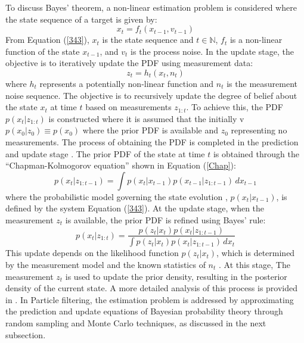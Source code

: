 To discuss Bayes' theorem, a non-linear estimation problem is considered where the state sequence of a target is given by:
\begin{equation}
    x_t = f_t(x_{t-1}, v_{t-1})
    \label{343}
\end{equation}
From Equation (\ref{343}), \(x_t\) is the state sequence and \(t \in \mathbb{N}\), \(f_t\) is a non-linear function of the state \(x_{t-1}\), and \(v_t\) is the process noise. In the update stage, the objective is to iteratively update the \ac{PDF} using measurement data:
\begin{equation}
    z_t = h_t(x_t, n_t)
\end{equation}
where \(h_t\) represents a potentially  non-linear function and \(n_t\) is the measurement noise sequence. The objective is to recursively update the degree of belief about the state \(x_t\) at time  \(t\) based on measurements \(z_{1:t}\). To achieve this, the \ac{PDF} \(p(x_t|z_{1:t})\) is constructed where it is assumed that the initially v \(p(x_0|z_0) \equiv p(x_0)\) where the prior \ac{PDF} is available and \(z_0\) representing no measurements. The process of obtaining the \ac{PDF} is completed in the prediction and update stage \cite{Arulampalam2007}.
\newline
\newline
The prior \ac{PDF} of the state at time \(t\) is obtained through the ``Chapman-Kolmogorov equation'' shown in Equation (\ref{Chap}):
\begin{equation}
    p(x_t|z_{1:t-1}) = \int p(x_t|x_{t-1}) p(x_{t-1}|z_{1:t-1}) \, dx_{t-1}
    \label{Chap}
\end{equation}
where the probabilistic model governing the state evolution \cite{Arulampalam2007}, \(p(x_t|x_{t-1})\), is defined by the system Equation (\ref{343}). At the update stage, when the measurement \(z_t\) is available, the prior \ac{PDF} is refined using Bayes' rule:
\begin{equation}
     p(x_t|z_{1:t}) = \frac{p(z_t|x_t) p(x_t|z_{1:t-1})}{\int p(z_t|x_t) p(x_t|z_{1:t-1}) \, dx_t}
    \label{bayes}
\end{equation}
This update depends on the likelihood function \(p(z_t|x_t)\), which is determined by the measurement model and the known statistics of \(n_t\) \cite{Arulampalam2007}. At this stage, The measurement \( z_t \) is used to update the prior density, resulting in the posterior density of the current state. A more detailed analysis of this process is provided in \cite{Arulampalam2007}.
\newline
\newline
In Particle filtering, the estimation problem is addressed by approximating the prediction and update equations of Bayesian probability theory through random sampling and Monte Carlo techniques, as discussed in the next subsection.

